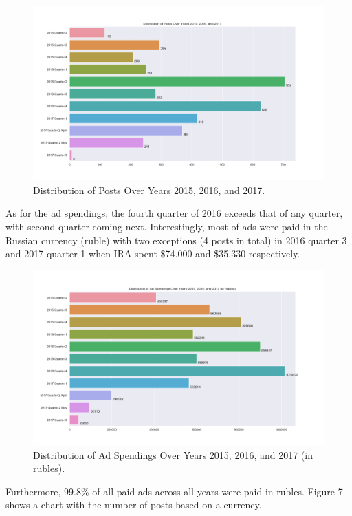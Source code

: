 \documentclass[12pt]{article}
\theoremstyle{definition}
\begin{document}
\begin{figure}[H]
\centering
\includegraphics[width=\columnwidth]{./image/barchart-plots/barchart_distribution_of_posts.png}
\caption{Distribution of Posts Over Years 2015, 2016, and 2017.}
\end{figure}

As for the ad spendings, the fourth quarter of 2016 exceeds that of any quarter,
with second quarter coming next. Interestingly, most of ads were paid in the
Russian currency (ruble) with two exceptions (4 posts in total) in 2016 quarter
3 and 2017 quarter 1 when IRA spent \$74.000 and \$35.330 respectively.

\begin{figure}[H]
\centering
\includegraphics[width=\columnwidth]{./image/barchart-plots/barchart_ad_spend_RU_distribution.png}
\caption{Distribution of Ad Spendings Over Years 2015, 2016, and 2017 (in rubles).}
\end{figure}

Furthermore, 99.8\% of all paid ads across all years were paid in rubles.
Figure 7 shows a chart with the number of posts based on a currency.
\end{document}
